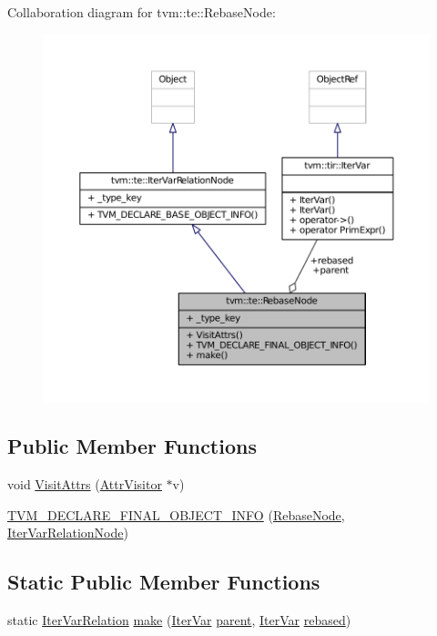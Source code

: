 Collaboration diagram for tvm\+:\+:te\+:\+:Rebase\+Node\+:
\nopagebreak
\begin{figure}[H]
\begin{center}
\leavevmode
\includegraphics[width=350pt]{classtvm_1_1te_1_1RebaseNode__coll__graph}
\end{center}
\end{figure}
\subsection*{Public Member Functions}
\begin{DoxyCompactItemize}
\item 
void \hyperlink{classtvm_1_1te_1_1RebaseNode_ad1f1f4d3c250d1f5110ada4ac577e27f}{Visit\+Attrs} (\hyperlink{classtvm_1_1AttrVisitor}{Attr\+Visitor} $\ast$v)
\item 
\hyperlink{classtvm_1_1te_1_1RebaseNode_ae3e2fdeaad4d6e501b8e79785c4da3ef}{T\+V\+M\+\_\+\+D\+E\+C\+L\+A\+R\+E\+\_\+\+F\+I\+N\+A\+L\+\_\+\+O\+B\+J\+E\+C\+T\+\_\+\+I\+N\+FO} (\hyperlink{classtvm_1_1te_1_1RebaseNode}{Rebase\+Node}, \hyperlink{classtvm_1_1te_1_1IterVarRelationNode}{Iter\+Var\+Relation\+Node})
\end{DoxyCompactItemize}
\subsection*{Static Public Member Functions}
\begin{DoxyCompactItemize}
\item 
static \hyperlink{classtvm_1_1te_1_1IterVarRelation}{Iter\+Var\+Relation} \hyperlink{classtvm_1_1te_1_1RebaseNode_a6622093ce84e285119800c6736f22801}{make} (\hyperlink{classtvm_1_1tir_1_1IterVar}{Iter\+Var} \hyperlink{classtvm_1_1te_1_1RebaseNode_a4fea0a62970e2831dd92c58aee14a1f4}{parent}, \hyperlink{classtvm_1_1tir_1_1IterVar}{Iter\+Var} \hyperlink{classtvm_1_1te_1_1RebaseNode_a3e718d8fd2ae0f2d76b794e6dfa303f0}{rebased})
\end{DoxyCompactItemize}
